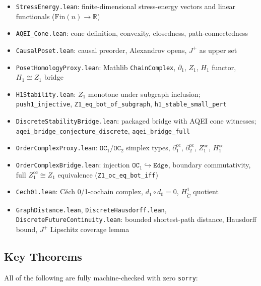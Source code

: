 \documentclass[12pt]{article}
\begin{document}
\begin{itemize}
    \item \texttt{StressEnergy.lean}: finite-dimensional stress-energy vectors
          and linear functionals ($\mathrm{Fin}(n) \to \mathbb{R}$)
    \item \texttt{AQEI\_Cone.lean}: cone definition, convexity,
          closedness, path-connectedness
    \item \texttt{CausalPoset.lean}: causal preorder, Alexandrov opens,
          $J^+$ as upper set
    \item \texttt{PosetHomologyProxy.lean}: Mathlib \texttt{ChainComplex},
          $\partial_1$, $Z_1$, $H_1$ functor, $H_1\cong Z_1$ bridge
    \item \texttt{H1Stability.lean}: $Z_1$ monotone under subgraph inclusion;
          \texttt{push1\_injective}, \texttt{Z1\_eq\_bot\_of\_subgraph},
          \texttt{h1\_stable\_small\_pert}
    \item \texttt{DiscreteStabilityBridge.lean}: packaged bridge with AQEI cone
          witnesses; \texttt{aqei\_bridge\_conjecture\_discrete},
          \texttt{aqei\_bridge\_full}
    \item \texttt{OrderComplexProxy.lean}: $\texttt{OC}_1/\texttt{OC}_2$
          simplex types, $\partial_1^{\mathrm{oc}}$, $\partial_2^{\mathrm{oc}}$,
          $Z_1^{\mathrm{oc}}$, $H_1^{\mathrm{oc}}$
    \item \texttt{OrderComplexBridge.lean}: injection $\texttt{OC}_1 \hookrightarrow
          \texttt{Edge}$, boundary commutativity, full $Z_1^{\mathrm{oc}}\cong Z_1$
          equivalence (\texttt{Z1\_oc\_eq\_bot\_iff})
    \item \texttt{Cech01.lean}: C\v{e}ch 0/1-cochain complex, $d_1\circ d_0=0$,
          $H^1_{\check{C}}$ quotient
    \item \texttt{GraphDistance.lean}, \texttt{DiscreteHausdorff.lean},
          \texttt{DiscreteFutureContinuity.lean}: bounded shortest-path
          distance, Hausdorff bound, $J^+$ Lipschitz coverage lemma
\end{itemize}

\subsection{Key Theorems}

All of the following are fully machine-checked with zero \texttt{sorry}:
\end{document}

